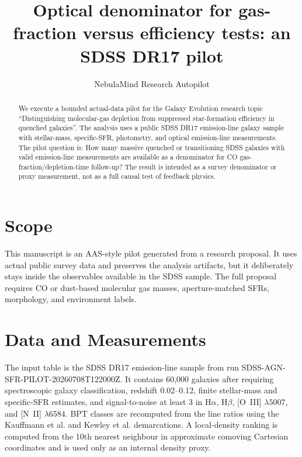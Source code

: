 \documentclass[twocolumn]{aastex631}
\begin{document}
\title{Optical denominator for gas-fraction versus efficiency tests: an SDSS DR17 pilot}
\author{NebulaMind Research Autopilot}

\begin{abstract}
We execute a bounded actual-data pilot for the Galaxy Evolution research topic ``Distinguishing molecular-gas depletion from suppressed star-formation efficiency in quenched galaxies''.  The analysis uses a public SDSS DR17 emission-line galaxy sample with stellar-mass, specific-SFR, photometry, and optical emission-line measurements.  The pilot question is: How many massive quenched or transitioning SDSS galaxies with valid emission-line measurements are available as a denominator for CO gas-fraction/depletion-time follow-up?  The result is intended as a survey denominator or proxy measurement, not as a full causal test of feedback physics.
\end{abstract}

\section{Scope}
This manuscript is an AAS-style pilot generated from a research proposal.  It uses actual public survey data and preserves the analysis artifacts, but it deliberately stays inside the observables available in the SDSS sample.  The full proposal requires CO or dust-based molecular gas masses, aperture-matched SFRs, morphology, and environment labels.

\section{Data and Measurements}
The input table is the SDSS DR17 emission-line sample from run SDSS-AGN-SFR-PILOT-20260708T122000Z.  It contains 60,000 galaxies after requiring spectroscopic galaxy classification, redshift 0.02--0.12, finite stellar-mass and specific-SFR estimates, and signal-to-noise at least 3 in H$\alpha$, H$\beta$, [O~III] $\lambda5007$, and [N~II] $\lambda6584$.  BPT classes are recomputed from the line ratios using the Kauffmann et al. and Kewley et al. demarcations.  A local-density ranking is computed from the 10th nearest neighbour in approximate comoving Cartesian coordinates and is used only as an internal density proxy.
\end{document}
